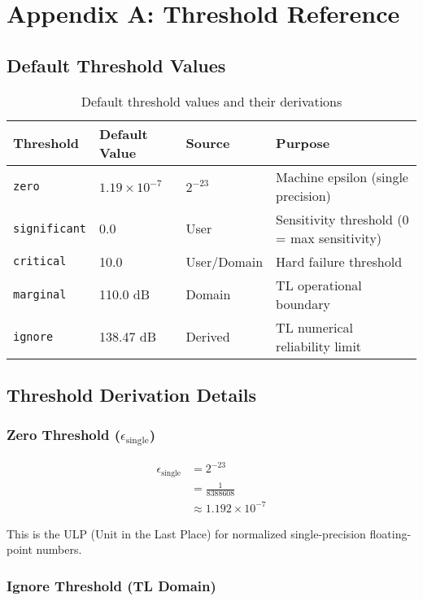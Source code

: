 \section{Appendix A: Threshold Reference}
\label{app:thresholds}

\subsection{Default Threshold Values}

\begin{table}[h]
\centering
\begin{tabular}{@{}llll@{}}
\toprule
\textbf{Threshold} & \textbf{Default Value} & \textbf{Source} & \textbf{Purpose} \\ \midrule
\texttt{zero} & $1.19 \times 10^{-7}$ & $2^{-23}$ & Machine epsilon (single precision) \\
\texttt{significant} & 0.0 & User & Sensitivity threshold (0 = max sensitivity) \\
\texttt{critical} & 10.0 & User/Domain & Hard failure threshold \\
\texttt{marginal} & 110.0 dB & Domain & TL operational boundary \\
\texttt{ignore} & 138.47 dB & Derived & TL numerical reliability limit \\ \bottomrule
\end{tabular}
\caption{Default threshold values and their derivations}
\label{tab:thresholds}
\end{table}

\subsection{Threshold Derivation Details}

\subsubsection{Zero Threshold ($\epsilon_{\text{single}}$)}

\begin{align}
    \epsilon_{\text{single}} &= 2^{-23} \\
    &= \frac{1}{8388608} \\
    &\approx 1.192 \times 10^{-7}
\end{align}

This is the ULP (Unit in the Last Place) for normalized single-precision floating-point numbers.

\subsubsection{Ignore Threshold (TL Domain)}

